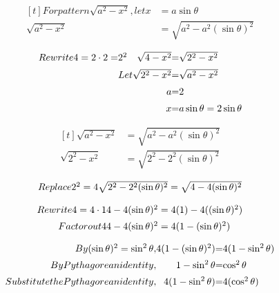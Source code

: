 \documentclass{article}
\begin{document}
\[
\begin{aligned}[t]
 For pattern \sqrt{a^2-x^2}, let x &= a\sin\theta\\
 \sqrt{a^2-x^2} &= \sqrt{a^2-a^2(\sin\theta)^2}
 \end{aligned}
\]

\[
\begin{array}{@{}r@{}l@{}r@{}c@{}l@{}}
 Rewrite 4=2\cdot 2=
 &
 2^2
 &
 \sqrt{4-x^2}
 &
 =
 &
 \sqrt{2^2-x^2}
 \\[1.2ex]
 &
 Let &
 \sqrt{2^2-x^2}
 &
 =
 &
 \sqrt{a^2-x^2}
 \\[1.2ex]
 &
 &
 a
 &
 =
 &
 2 \\[1.2ex]
 &
 &
 x
 &
 =
 &
 a \sin\theta = 2 \sin\theta
 \end{array}
\]

\[
\begin{aligned}[t]
 \sqrt{a^2-x^2}
 &= \sqrt{a^2-a^2(\sin\theta)^2}\\
 \sqrt{2^2-x^2}
 &= \sqrt{2^2-2^2(\sin\theta)^2}
 \end{aligned}
\]

\[
\begin{array}{@{}r@{}l@{}}
 Replace 2^2=4
 &
 \sqrt{ 2^2 - 2^2 (\sin\theta)^2}
 = \sqrt{ 4 - 4 (\sin\theta)^2}
 \end{array}
\]

\[
\begin{array}{@{}r@{}l@{}}
 Rewrite 4=4\cdot 1
 &
 4 -4(\sin\theta)^2
 = 4(1) -4((\sin\theta)^2)
 \\[1.2ex]
 Factor out 4
 &
 4 - 4 (\sin\theta)^2
 = 4 (1-(\sin\theta)^2)
 \end{array}
\]

\[
\begin{array}{@{}r@{}r@{}c@{}l@{}}
 By (\sin\theta)^2=\sin^2\theta , &
 4(1- (\sin\theta)^2 )
 &
 =
 &
 4(1- \sin^2\theta )
 \\[1.2ex]
 By Pythagorean identity , &
 1-\sin^2\theta
 &
 =
 &
 \cos^2\theta
 \\[1.2ex]
 Substitute the Pythagorean identity, &
 4( 1-\sin^2\theta )
 &
 =
 &
 4( \cos^2\theta )
 \end{array}
\]
\end{document}
